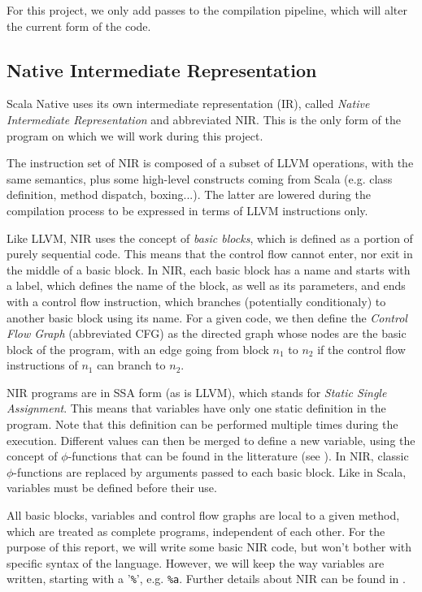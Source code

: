\documentclass[12pt,a4paper]{article}
\newcommand{\nir}[1]{\texttt{#1}}
\begin{document}
For this project, we only add passes to the compilation pipeline, which will alter the current form of the code.

\subsection{Native Intermediate Representation}

Scala Native uses its own intermediate representation (IR), called \textit{Native Intermediate Representation} and abbreviated NIR. This is the only form of the program on which we will work during this project.

The instruction set of NIR is composed of a subset of LLVM operations, with the same semantics, plus some high-level constructs coming from Scala (e.g. class definition, method dispatch, boxing...). The latter are lowered during the compilation process to be expressed in terms of LLVM instructions only.

Like LLVM, NIR uses the concept of \textit{basic blocks}, which is defined as a portion of purely sequential code. This means that the control flow cannot enter, nor exit in the middle of a basic block. In NIR, each basic block has a name and starts with a label, which defines the name of the block, as well as its parameters, and ends with a control flow instruction, which branches (potentially conditionaly) to another basic block using its name. For a given code, we then define the \textit{Control Flow Graph} (abbreviated CFG) as the directed graph whose nodes are the basic block of the program, with an edge going from block $n_1$ to $n_2$ if the control flow instructions of $n_1$ can branch to $n_2$. 

NIR programs are in SSA form (as is LLVM), which stands for \textit{Static Single Assignment}. This means that variables have only one static definition in the program. Note that this definition can be performed multiple times during the execution. Different values can then be merged to define a new variable, using the concept of $\phi$-functions that can be found in the litterature (see \cite{ssabook}). In NIR, classic $\phi$-functions are replaced by arguments passed to each basic block. Like in Scala, variables must be defined before their use.


All basic blocks, variables and control flow graphs are local to a given method, which are treated as complete programs, independent of each other. For the purpose of this report, we will write some basic NIR code, but won't bother with specific syntax of the language. However, we will keep the way variables are written, starting with a '\nir{\%}', e.g. \nir{\%a}. Further details about NIR can be found in \cite{nirdoc}.
\end{document}
